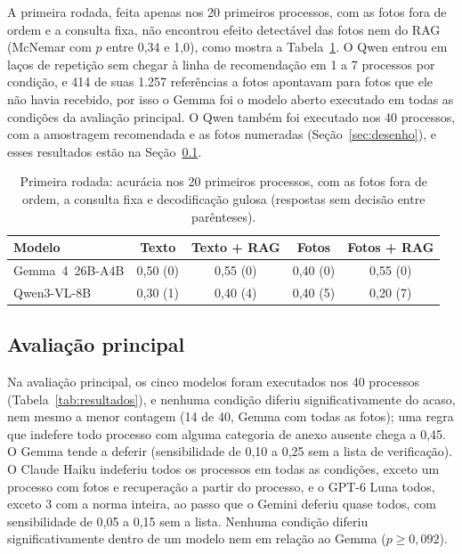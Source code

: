 A primeira rodada, feita apenas nos 20 primeiros processos, com as fotos fora de ordem e a consulta fixa, não encontrou efeito detectável das fotos nem do RAG (McNemar com $p$ entre 0,34 e 1,0), como mostra a Tabela~\ref{tab:primeira-rodada}. O Qwen entrou em laços de repetição \cite{Holtzman2020} sem chegar à linha de recomendação em 1 a 7 processos por condição, e 414 de suas 1.257 referências a fotos apontavam para fotos que ele não havia recebido, por isso o Gemma foi o modelo aberto executado em todas as condições da avaliação principal. O Qwen também foi executado nos 40 processos, com a amostragem recomendada e as fotos numeradas (Seção~\ref{sec:desenho}), e esses resultados estão na Seção~\ref{sec:resultados-principal}.

\begin{table}[htb]
	\centering
	\caption{Primeira rodada: acurácia nos 20 primeiros processos, com as fotos fora de ordem, a consulta fixa e decodificação gulosa (respostas sem decisão entre parênteses).}
	\label{tab:primeira-rodada}
	\small
	\begin{tabular}{|l|c|c|c|c|}
		\hline
		\textbf{Modelo} & \textbf{Texto} & \textbf{Texto + RAG} & \textbf{Fotos} & \textbf{Fotos + RAG} \\
		\hline
		Gemma~4~26B-A4B & 0,50 (0) & 0,55 (0) & 0,40 (0) & 0,55 (0) \\
		Qwen3-VL-8B & 0,30 (1) & 0,40 (4) & 0,40 (5) & 0,20 (7) \\
		\hline
	\end{tabular}
\end{table}

\subsection{Avaliação principal}
\label{sec:resultados-principal}

Na avaliação principal, os cinco modelos foram executados nos 40 processos (Tabela~\ref{tab:resultados}), e nenhuma condição diferiu significativamente do acaso, nem mesmo a menor contagem (14 de 40, Gemma com todas as fotos); uma regra que indefere todo processo com alguma categoria de anexo ausente chega a 0,45. O Gemma tende a deferir (sensibilidade de 0,10 a 0,25 sem a lista de verificação). O Claude Haiku indeferiu todos os processos em todas as condições, exceto um processo com fotos e recuperação a partir do processo, e o GPT-6 Luna todos, exceto 3 com a norma inteira, ao passo que o Gemini deferiu quase todos, com sensibilidade de 0,05 a 0,15 sem a lista. Nenhuma condição diferiu significativamente dentro de um modelo nem em relação ao Gemma ($p\ge0{,}092$).

